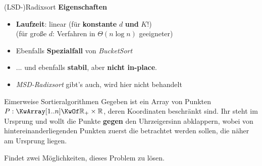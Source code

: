 \begin{frame}{(LSD-)Radixsort}
	\textbf{Eigenschaften}   
	\begin{itemize}
		\item \textbf{Laufzeit}: linear (für \textbf{konstante} $d$ \textbf{und} $K$!) \\
		\pause
		(für große $d$: Verfahren in $\Theta(n \log n)$ geeigneter)
		\pause
		\item Ebenfalls \textbf{Spezialfall} von \emph{BucketSort}
		\pause
		\item ... und ebenfalls \textbf{stabil}, aber \textbf{nicht in-place}.
		\pause
		\item \emph{MSD-Radixsort} gibt's auch, wird hier nicht behandelt
	\end{itemize}
\end{frame}

\begin{frame}{Eimerweise Sortieralgorithmen}
	Gegeben ist ein Array von Punkten $P: \KwArray[1..n] \KwOf \R_+ \times \R$, deren Koordinaten beschränkt sind. Ihr steht im Ursprung und wollt die Punkte \textbf{gegen} den Uhrzeigersinn abklappern, wobei von hintereinanderliegenden Punkten zuerst die betrachtet werden sollen, die näher am Ursprung liegen. \\ 
	\vspace{-1.3\baselineskip}
	\begin{center}
	\end{center} 
	\vspace{-.5\baselineskip}
	Findet zwei Möglichkeiten, dieses Problem zu lösen. 
\end{frame}

